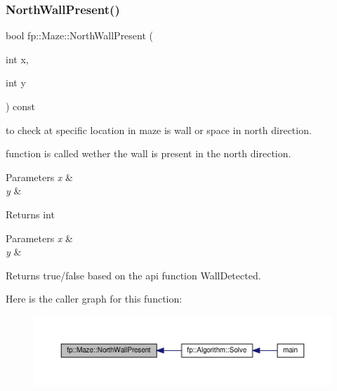 \subsubsection{\texorpdfstring{North\+Wall\+Present()}{NorthWallPresent()}}
{\footnotesize\ttfamily bool fp\+::\+Maze\+::\+North\+Wall\+Present (\begin{DoxyParamCaption}\item[{int}]{x,  }\item[{int}]{y }\end{DoxyParamCaption}) const}



to check at specific location in maze is wall or space in north direction. 

function is called wether the wall is present in the north direction.


\begin{DoxyParams}{Parameters}
{\em x} & \\
\hline
{\em y} & \\
\hline
\end{DoxyParams}
\begin{DoxyReturn}{Returns}
int
\end{DoxyReturn}

\begin{DoxyParams}{Parameters}
{\em x} & \\
\hline
{\em y} & \\
\hline
\end{DoxyParams}
\begin{DoxyReturn}{Returns}
true/false based on the api function Wall\+Detected. 
\end{DoxyReturn}
Here is the caller graph for this function\+:
\nopagebreak
\begin{figure}[H]
\begin{center}
\leavevmode
\includegraphics[width=350pt]{classfp_1_1_maze_af072147db014d3955ba343cd8250d5f1_icgraph}
\end{center}
\end{figure}
\mbox{\label{classfp_1_1_maze_a6cc110e308818595983345285245c33f}} 
